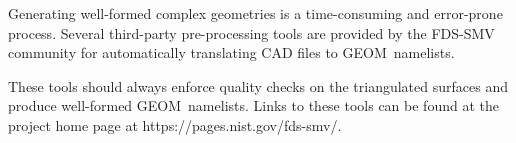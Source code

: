 \documentclass[12pt]{article}
\begin{document}
Generating well-formed complex geometries is a time-consuming and error-prone process.
Several third-party pre-processing tools are provided by the FDS-SMV community for automatically translating CAD files to {\ct GEOM}\ namelists.

These tools should always enforce quality checks on the triangulated surfaces and produce well-formed {\ct GEOM}\ namelists.
Links to these tools can be found at the project home page at https://pages.nist.gov/fds-smv/.



%
%
%
%
%
%
%
%
\end{document}
